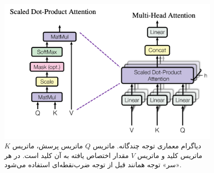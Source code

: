 \begin{figure}
	\centering
	\includegraphics[width=0.7\linewidth]{figs/mhattn1.png}
	\caption{دیاگرام معماری توجه چندگانه. ماتریس $Q$ ماتریس پرسش، ماتریس $K$ ماتریس کلید و ماتریس $V$ مقدار اختصاص یافته به آن کلید است. در هر «سر» توجه همانند قبل از توجه ضرب‌نقطه‌ای استفاده می‌شود.}
	\label{fig:mhattn1}
\end{figure}

%


%
%
%
%
%


